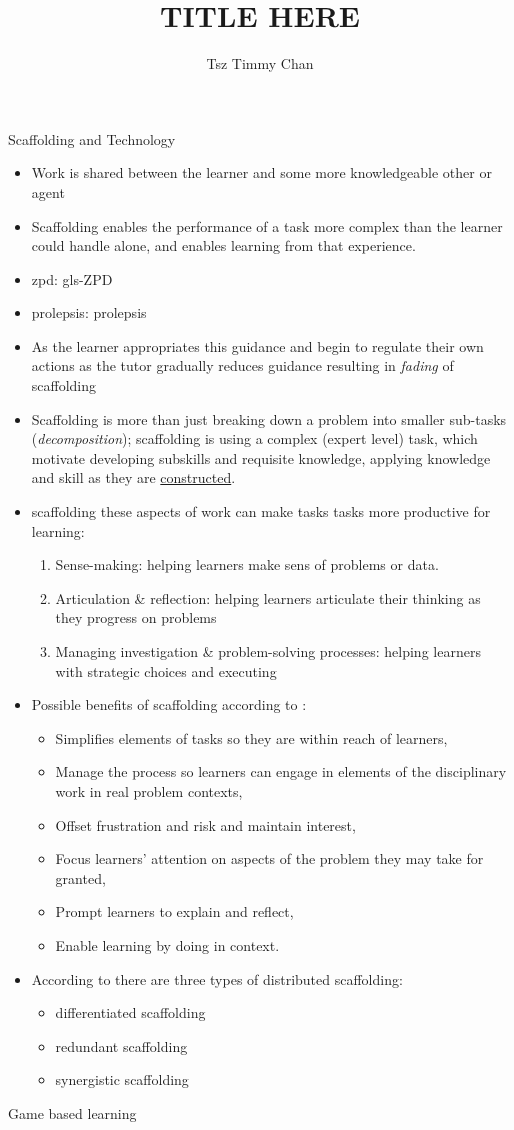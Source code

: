 \documentclass{TC}
\title{TITLE HERE}	%
\author{Tsz Timmy Chan}	%
\begin{document}
Scaffolding \parencite{sawyer_scaffolding_2014, fischer_research_2018} and Technology \parencite{sawyer_knowledge_2014}
\begin{itemize}
\item Work is shared between the learner and some more knowledgeable other or agent
\item Scaffolding enables the performance of a task more complex than the learner could handle alone, and enables learning from that experience.
\item \gls{zpd}: \glsdesc{gls-ZPD}
\item \gls{prolepsis}: \glsdesc{prolepsis}
\item As the learner appropriates this guidance and begin to regulate their own actions as the tutor gradually reduces guidance resulting in \emph{fading} of scaffolding
\item Scaffolding is more than just breaking down a problem into smaller sub-tasks (\textit{decomposition}); scaffolding is using a complex (expert level) task, which motivate developing subskills and requisite knowledge, applying knowledge and skill as they are \underline{constructed}.
\item scaffolding these aspects of work can make tasks tasks more productive for learning:
	\begin{enumerate}
	\item Sense-making: helping learners make sens of problems or data.
	\item Articulation \& reflection: helping learners articulate their thinking as they progress on problems
	\item Managing investigation \& problem-solving processes: helping learners with strategic choices and executing 
	\end{enumerate}
\item Possible benefits of scaffolding according to \parencite{sawyer_scaffolding_2014}:
	\begin{itemize}
	\item Simplifies elements of tasks so they are within reach of learners,
	\item Manage the process so learners can engage in elements of the disciplinary work in real problem contexts,
	\item Offset frustration and risk and maintain interest,
	\item Focus learners' attention on aspects of the problem they may take for granted,
	\item Prompt learners to explain and reflect,
	\item Enable learning by doing in context.
	\end{itemize}
\item According to there are three types of \gls{distributed scaffolding}: 
	\begin{itemize}
	\item \Gls{differentiated scaffolding}
	\item \Gls{redundant scaffolding}
	\item \Gls{synergistic scaffolding}
	\end{itemize}
\end{itemize}

Game based learning %
\end{document}
